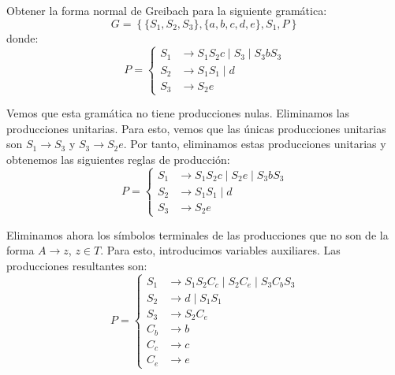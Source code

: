 \begin{ejercicio}\label{ej:1.4.11}
    Obtener la forma normal de Greibach para la siguiente gramática:
    \begin{equation*}
        G=\left\{ \{ S_1, S_2, S_3 \}, \{ a, b, c, d, e \}, S_1, P \right\}
    \end{equation*}
    donde:
    \begin{equation*}
        P = \left\{
            \begin{aligned}
                S_1 &\rightarrow S_1 S_2 c \mid S_3 \mid S_3 b S_3\\
                S_2 &\rightarrow S_1 S_1 \mid d\\
                S_3 &\rightarrow S_2 e
            \end{aligned}
        \right.
    \end{equation*}
    
    
    Vemos que esta gramática no tiene producciones nulas. Eliminamos las producciones unitarias. Para esto, vemos que las únicas producciones unitarias son $S_1\to S_3$ y $S_3\to S_2e$. Por tanto, eliminamos estas producciones unitarias y obtenemos las siguientes reglas de producción:
    \begin{equation*}
        P = \left\{
            \begin{aligned}
                S_1 &\rightarrow S_1 S_2 c \mid S_2e \mid S_3 b S_3\\
                S_2 &\rightarrow S_1 S_1 \mid d\\
                S_3 &\rightarrow S_2 e
            \end{aligned}
        \right.
    \end{equation*}

    Eliminamos ahora los símbolos terminales de las producciones que no son de la forma $A\to z$, $z\in T$. Para esto, introducimos variables auxiliares. Las producciones resultantes son:
    \begin{equation*}
        P = \left\{
            \begin{aligned}
                S_1 &\rightarrow S_1 S_2 C_c \mid S_2C_e \mid S_3 C_b S_3\\
                S_2 &\rightarrow d \mid S_1 S_1\\
                S_3 &\rightarrow S_2 C_e\\
                C_b &\rightarrow b\\
                C_c &\rightarrow c\\
                C_e &\rightarrow e
            \end{aligned}
        \right.
    \end{equation*}


\end{ejercicio}
